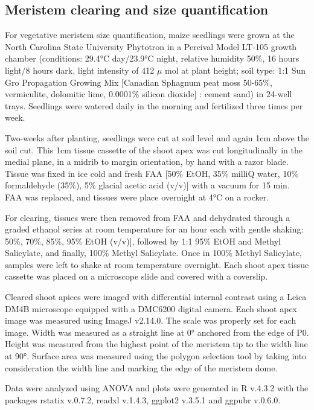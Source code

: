 \documentclass[9pt,twocolumn,twoside]{rilabRxiv}
\begin{document}
\subsection{Meristem clearing and size quantification}

For vegetative meristem size quantification, maize seedlings were grown at the North Carolina State University Phytotron in a Percival Model LT-105 growth chamber (conditions: 29.4°C day/23.9°C night, relative humidity 50\%, 16 hours light/8 hours dark, light intensity of 412 $\mu$ mol at plant height; soil type: 1:1 Sun Gro Propagation Growing Mix [Canadian Sphagnum peat moss 50-65\%, vermiculite, dolomitic lime, 0.0001\% silicon dioxide] : cement sand) in 24-well trays.
Seedlings were watered daily in the morning and fertilized three times per week.

Two-weeks after planting, seedlings were cut at soil level and again 1cm above the soil cut.
This 1cm tissue cassette of the shoot apex was cut longitudinally in the medial plane, in a midrib to margin orientation, by hand with a razor blade.
Tissue was fixed in ice cold and fresh FAA [50\% EtOH, 35\% milliQ water, 10\% formaldehyde (35\%), 5\% glacial acetic acid (v/v)] with a vacuum for 15 min.
FAA was replaced, and tissues were place overnight at 4°C on a rocker.

For clearing, tissues were then removed from FAA and dehydrated through a graded ethanol series at room temperature for an hour each with gentle shaking: 50\%, 70\%, 85\%, 95\% EtOH (v/v)], followed by 1:1 95\% EtOH and Methyl Salicylate, and finally, 100\% Methyl Salicylate.
Once in 100\% Methyl Salicylate, samples were left to shake at room temperature overnight.
Each shoot apex tissue cassette was placed on a microscope slide and covered with a coverslip.

Cleared shoot apices were imaged with differential internal contrast using a Leica DM4B microscope equipped with a DMC6200 digital camera.
Each shoot apex image was measured using ImageJ v2.14.0.
The scale was properly set for each image.
Width was measured as a straight line at 0° anchored from the edge of P0.
Height was measured from the highest point of the meristem tip to the width line at 90°.
Surface area was measured using the polygon selection tool by taking into consideration the width line and marking the edge of the meristem dome.

Data were analyzed using ANOVA and plots were generated in R v.4.3.2 with the packages rstatix v.0.7.2, readxl v.1.4.3, ggplot2 v.3.5.1 and ggpubr v.0.6.0.
\end{document}
